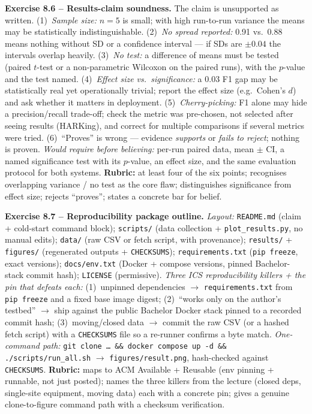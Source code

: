 \documentclass[11pt,a4paper]{article}
\begin{document}
\begin{solutionbox}
\textbf{Exercise 8.6 -- Results-claim soundness.}
The claim is unsupported as written. (1)~\emph{Sample size:} $n=5$ is small; with
high run-to-run variance the means may be statistically indistinguishable.
(2)~\emph{No spread reported:} 0.91 vs.\ 0.88 means nothing without SD or a
confidence interval --- if SDs are $\pm 0.04$ the intervals overlap heavily.
(3)~\emph{No test:} a difference of means must be tested (paired
$t$-test or a non-parametric Wilcoxon on the paired runs), with the $p$-value and
the test named. (4)~\emph{Effect size vs.\ significance:} a 0.03 F1 gap may be
statistically real yet operationally trivial; report the effect size (e.g.\
Cohen's $d$) and ask whether it matters in deployment. (5)~\emph{Cherry-picking:}
F1 alone may hide a precision/recall trade-off; check the metric was pre-chosen, not
selected after seeing results (HARKing), and correct for multiple comparisons if
several metrics were tried. (6)~``Proves'' is wrong --- evidence \emph{supports}
or \emph{fails to reject}; nothing is proven. \textit{Would require before
believing:} per-run paired data, mean $\pm$ CI, a named significance test with its
$p$-value, an effect size, and the same evaluation protocol for both systems.
\textbf{Rubric:} at least four of the six points; recognises overlapping
variance / no test as the core flaw; distinguishes significance from effect size;
rejects ``proves''; states a concrete bar for belief.
\end{solutionbox}

\begin{solutionbox}
\textbf{Exercise 8.7 -- Reproducibility package outline.}
\textit{Layout:} \texttt{README.md} (claim + cold-start command block);
\texttt{scripts/} (data collection + \texttt{plot\_results.py}, no manual edits);
\texttt{data/} (raw CSV or fetch script, with provenance); \texttt{results/} +
\texttt{figures/} (regenerated outputs + \texttt{CHECKSUMS}); \texttt{requirements.txt}
(\texttt{pip freeze}, exact versions); \texttt{docs/env.txt} (Docker + compose
versions, pinned Bachelor-stack commit hash); \texttt{LICENSE} (permissive).
\textit{Three ICS reproducibility killers + the pin that defeats each:}
(1)~unpinned dependencies $\to$ \texttt{requirements.txt} from \texttt{pip freeze}
and a fixed base image digest; (2)~``works only on the author's testbed'' $\to$
ship against the public Bachelor Docker stack pinned to a recorded commit hash;
(3)~moving/closed data $\to$ commit the raw CSV (or a hashed fetch script) with a
\texttt{CHECKSUMS} file so a re-runner confirms a byte match. \textit{One-command
path:} \texttt{git clone \dots\ \&\& docker compose up -d \&\& ./scripts/run\_all.sh}
$\to$ \texttt{figures/result.png}, hash-checked against \texttt{CHECKSUMS}.
\textbf{Rubric:} maps to ACM Available + Reusable (env pinning + runnable, not just
posted); names the three killers from the lecture (closed deps, single-site
equipment, moving data) each with a concrete pin; gives a genuine clone-to-figure
command path with a checksum verification.
\end{solutionbox}
\end{document}
